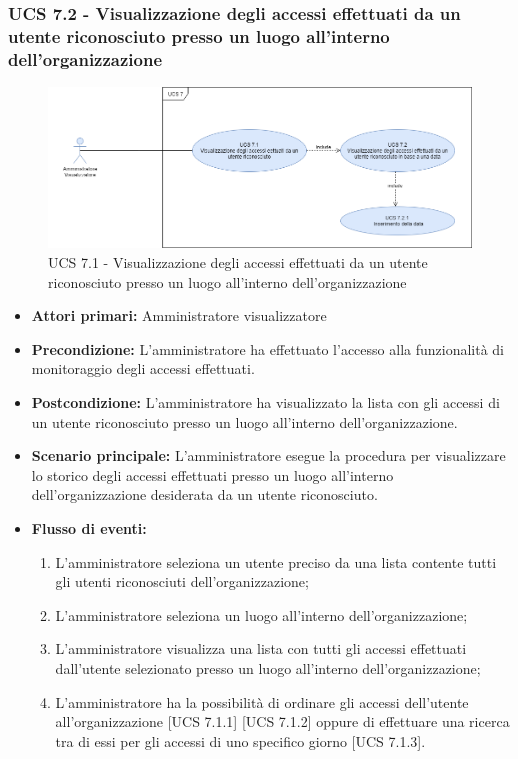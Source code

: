 \subsubsection{UCS 7.2 - Visualizzazione degli accessi effettuati da un utente riconosciuto presso un luogo all'interno dell'organizzazione}
\begin{figure}[h]
	\centering
	\includegraphics[scale=0.4]{sezioni/UseCase/Immagini/UCS7.png}
	\caption{UCS 7.1 - Visualizzazione degli accessi effettuati da un utente riconosciuto presso un luogo all'interno dell'organizzazione}
\end{figure}
\begin{itemize}
	\item \textbf{Attori primari:} Amministratore visualizzatore
	\item \textbf{Precondizione:} L'amministratore ha effettuato l'accesso alla funzionalità di monitoraggio degli accessi effettuati.
	\item \textbf{Postcondizione:} L'amministratore ha visualizzato la lista con gli accessi di un utente riconosciuto presso un luogo all'interno dell'organizzazione.
	\item \textbf{Scenario principale:} L'amministratore esegue la procedura per visualizzare lo storico degli accessi effettuati presso un luogo all'interno dell'organizzazione desiderata da un utente riconosciuto.
	\item \textbf{Flusso di eventi:}
	\begin{enumerate}
	\item L'amministratore seleziona un utente preciso da una lista contente tutti gli utenti riconosciuti dell'organizzazione;
	\item L'amministratore seleziona un luogo all'interno dell'organizzazione;
	\item L'amministratore visualizza una lista con tutti gli accessi effettuati dall'utente selezionato presso un luogo all'interno dell'organizzazione;
	\item L'amministratore ha la possibilità di ordinare gli accessi dell'utente all'organizzazione [UCS 7.1.1] [UCS 7.1.2] oppure di effettuare una ricerca tra di essi per gli accessi di uno specifico giorno [UCS 7.1.3].
	\end{enumerate}
\end{itemize}




